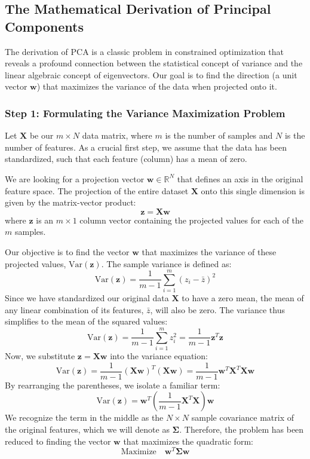 \subsection{The Mathematical Derivation of Principal Components}
\label{subsec:pca_derivation}
The derivation of PCA is a classic problem in constrained optimization that reveals a profound connection between the statistical concept of variance and the linear algebraic concept of eigenvectors. Our goal is to find the direction (a unit vector $\mathbf{w}$) that maximizes the variance of the data when projected onto it.

\subsubsection{Step 1: Formulating the Variance Maximization Problem}
Let $\mathbf{X}$ be our $m \times N$ data matrix, where $m$ is the number of samples and $N$ is the number of features. As a crucial first step, we assume that the data has been standardized, such that each feature (column) has a mean of zero.

We are looking for a projection vector $\mathbf{w} \in \mathbb{R}^N$ that defines an axis in the original feature space. The projection of the entire dataset $\mathbf{X}$ onto this single dimension is given by the matrix-vector product:
$$ \mathbf{z} = \mathbf{Xw} $$
where $\mathbf{z}$ is an $m \times 1$ column vector containing the projected values for each of the $m$ samples.

Our objective is to find the vector $\mathbf{w}$ that maximizes the variance of these projected values, $\text{Var}(\mathbf{z})$. The sample variance is defined as:
$$ \text{Var}(\mathbf{z}) = \frac{1}{m-1}\sum_{i=1}^{m} (z_i - \bar{z})^2 $$
Since we have standardized our original data $\mathbf{X}$ to have a zero mean, the mean of any linear combination of its features, $\bar{z}$, will also be zero. The variance thus simplifies to the mean of the squared values:
$$ \text{Var}(\mathbf{z}) = \frac{1}{m-1}\sum_{i=1}^{m} z_i^2 = \frac{1}{m-1}\mathbf{z}^T\mathbf{z} $$
Now, we substitute $\mathbf{z} = \mathbf{Xw}$ into the variance equation:
$$ \text{Var}(\mathbf{z}) = \frac{1}{m-1}(\mathbf{Xw})^T(\mathbf{Xw}) = \frac{1}{m-1}\mathbf{w}^T\mathbf{X}^T\mathbf{Xw} $$
By rearranging the parentheses, we isolate a familiar term:
$$ \text{Var}(\mathbf{z}) = \mathbf{w}^T \left(\frac{1}{m-1}\mathbf{X}^T \mathbf{X}\right) \mathbf{w} $$
We recognize the term in the middle as the $N \times N$ sample covariance matrix of the original features, which we will denote as $\mathbf{\Sigma}$. Therefore, the problem has been reduced to finding the vector $\mathbf{w}$ that maximizes the quadratic form:
$$ \text{Maximize} \quad \mathbf{w}^T \mathbf{\Sigma} \mathbf{w} $$

